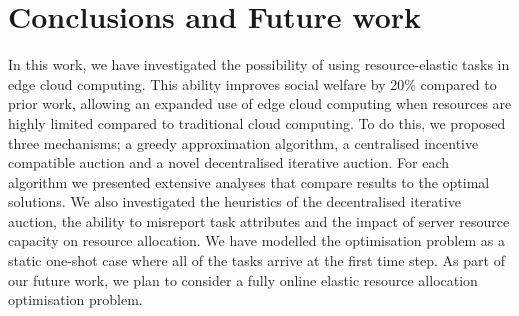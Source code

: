 \section{Conclusions and Future work}\label{sec:conclusion-and-future-work}
In this work, we have investigated the possibility of using resource-elastic tasks in edge cloud computing. This ability improves social welfare by 20\% compared to prior work, allowing an expanded use of edge cloud computing when resources are highly limited compared to traditional cloud computing. To do this, we proposed three mechanisms; a greedy approximation algorithm, a centralised incentive compatible auction and a novel decentralised iterative auction. For each algorithm we presented extensive analyses that compare results to the optimal solutions. We also investigated the heuristics of the decentralised iterative auction, the ability to misreport task attributes and the impact of server resource capacity on resource allocation. We have modelled the optimisation problem as a static one-shot case where all of the tasks arrive at the first time step. As part of our future work, we plan to consider a fully online elastic resource allocation optimisation problem. 